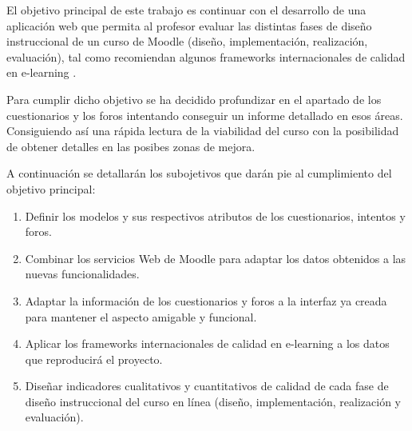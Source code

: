 
El objetivo principal de este trabajo es continuar con el desarrollo de una aplicación web que permita al profesor evaluar las distintas fases de diseño instruccional de un curso de Moodle (diseño, implementación, realización, evaluación), tal como recomiendan algunos frameworks internacionales de calidad en e-learning \cite{previotfg}.

Para cumplir dicho objetivo se ha decidido profundizar en el apartado de los cuestionarios y los foros intentando conseguir un informe detallado en esos áreas. Consiguiendo así una rápida lectura de la viabilidad del curso con la posibilidad de obtener detalles en las posibes zonas de mejora.

A continuación se detallarán los subojetivos que darán pie al cumplimiento del objetivo principal:
\begin{enumerate}
    \item Definir los modelos y sus respectivos atributos de los cuestionarios, intentos y foros.
    \item Combinar los servicios Web de Moodle para adaptar los datos obtenidos a las nuevas funcionalidades.
    \item Adaptar la información de los cuestionarios y foros a la interfaz ya creada para mantener el aspecto amigable y funcional.
    \item Aplicar los frameworks internacionales de calidad en e-learning a los datos que reproducirá el proyecto.
    \item Diseñar indicadores cualitativos y cuantitativos de calidad de cada fase de diseño instruccional del curso en línea (diseño, implementación, realización y evaluación)\cite{previotfg}.
\end{enumerate}